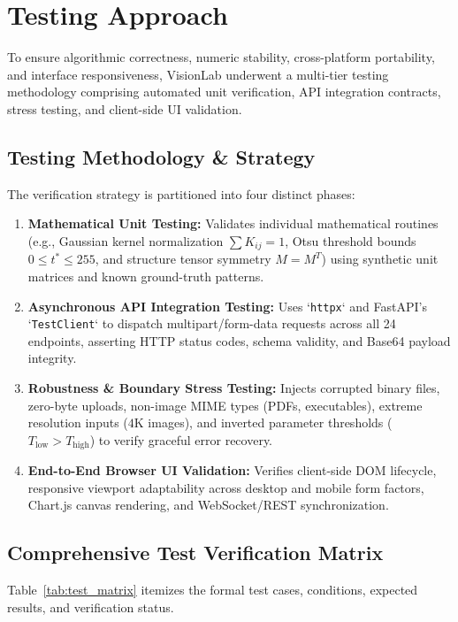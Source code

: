\section{Testing Approach}

To ensure algorithmic correctness, numeric stability, cross-platform portability, and interface responsiveness, VisionLab underwent a multi-tier testing methodology comprising automated unit verification, API integration contracts, stress testing, and client-side UI validation.

\subsection{Testing Methodology \& Strategy}
The verification strategy is partitioned into four distinct phases:
\begin{enumerate}
    \item \textbf{Mathematical Unit Testing:} Validates individual mathematical routines (e.g., Gaussian kernel normalization $\sum K_{ij} = 1$, Otsu threshold bounds $0 \le t^* \le 255$, and structure tensor symmetry $M = M^T$) using synthetic unit matrices and known ground-truth patterns.
    \item \textbf{Asynchronous API Integration Testing:} Uses `\texttt{httpx}` and FastAPI's `\texttt{TestClient}` to dispatch multipart/form-data requests across all 24 endpoints, asserting HTTP status codes, schema validity, and Base64 payload integrity.
    \item \textbf{Robustness \& Boundary Stress Testing:} Injects corrupted binary files, zero-byte uploads, non-image MIME types (PDFs, executables), extreme resolution inputs ($4\text{K}$ images), and inverted parameter thresholds ($T_{\text{low}} > T_{\text{high}}$) to verify graceful error recovery.
    \item \textbf{End-to-End Browser UI Validation:} Verifies client-side DOM lifecycle, responsive viewport adaptability across desktop and mobile form factors, Chart.js canvas rendering, and WebSocket/REST synchronization.
\end{enumerate}

\subsection{Comprehensive Test Verification Matrix}
Table~\ref{tab:test_matrix} itemizes the formal test cases, conditions, expected results, and verification status.

